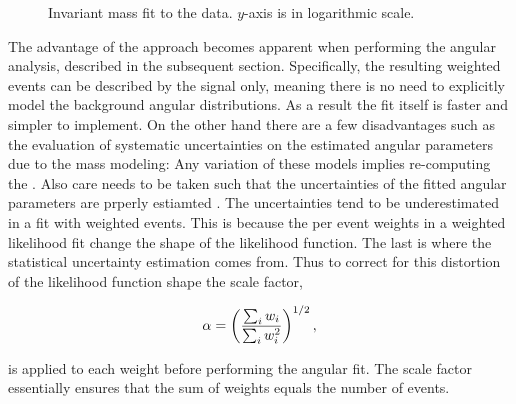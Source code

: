 \begin{figure}[t]
  \centering
  \scalebox{0.5}{}
  \caption{Invariant mass fit to the data. $y$-axis is in logarithmic scale.}
  \label{mass_plot}
\end{figure}

The advantage of the \sWeights approach becomes apparent when performing the angular analysis, described in the subsequent section.
Specifically, the resulting weighted events can be described by the signal \pdf only, meaning there is no need to explicitly model
the background angular distributions. As a result the fit itself is faster and simpler to implement. On the other hand there are a few
disadvantages such as the evaluation of systematic uncertainties on the estimated angular parameters due to the mass \pdf modeling:
Any variation of these models implies re-computing the \sWeights. Also care needs to be taken such that the uncertainties
of the fitted angular parameters are prperly estiamted \cite{splot}. The uncertainties tend to be underestimated in a fit with weighted
events. This is because the per event weights in a weighted likelihood fit change the shape of the likelihood function.
The last is where the statistical uncertainty estimation comes from. Thus to correct for this distortion of the likelihood
function shape the scale factor,

\begin{equation}
  \centering
  \alpha = \left(\frac{\sum_{i} w_i}{\sum_{i} w_i^2}\right)^{1/2},
  \label{sWeights_scale_factor}
\end{equation}

\noindent is applied to each weight before performing the angular fit. The scale factor essentially ensures that the sum of weights
equals the  number of events.
